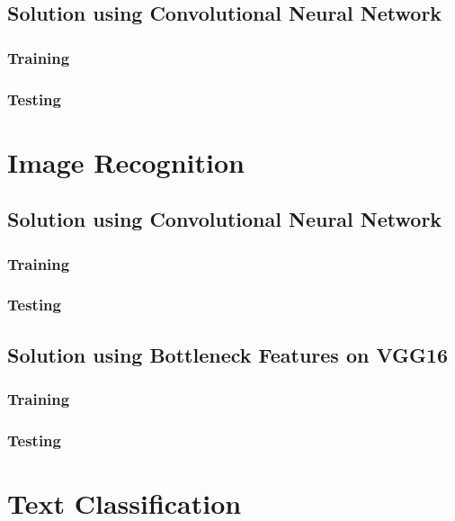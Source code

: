 \documentclass[10pt,twoside,a4paper,openany]{memoir}
\begin{document}
\section{Solution using Convolutional Neural Network}
\subsection{Training}


\subsection{Testing}


\chapter{Image Recognition}

\section{Solution using Convolutional Neural Network}
\subsection{Training}


\subsection{Testing}


\section{Solution using Bottleneck Features on VGG16}
\subsection{Training}


\subsection{Testing}


\chapter{Text Classification}
\end{document}
